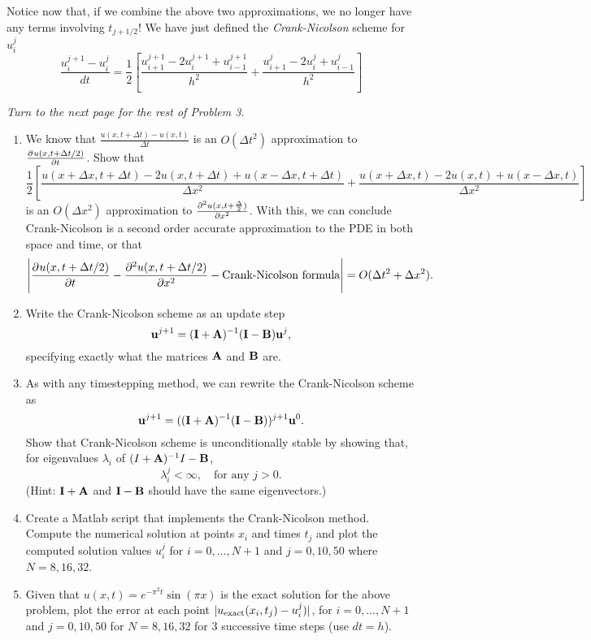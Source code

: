 Notice now that, if we combine the above two approximations, we no longer have any terms involving $t_{j+1/2}$!  We have just defined the \emph{Crank-Nicolson} scheme for $u_i^{j}$
\[
\frac{u_i^{j+ 1}-u_i^{j}}{dt} = \frac{1}{2}\left[\frac{u_{i+1}^{j+1} - 2u_i^{j+1} + u_{i-1}^{j+1}}{h^2} + \frac{u_{i+1}^{j} - 2u_i^{j} + u_{i-1}^{j}}{h^2}\right]
\] 
\vspace{2cm}
\begin{center}
\emph{Turn to the next page for the rest of Problem 3.}
\end{center} 
\newpage
\begin{enumerate}
\item We know that $\frac{u(x,t+\Delta t)-u(x,t)}{\Delta t}$ is an $O(\Delta t^2)$ approximation to $\frac{\partial^{} u(x,t + \Delta t/2)}{\partial t^{}}$.  Show that 
\[
\frac{1}{2}\left[\frac{u(x+ \Delta x,t+\Delta t) - 2u(x,t+\Delta t) + u( x - \Delta x,t+\Delta t)}{\Delta x^2} + \frac{u(x+ \Delta x,t) - 2u(x,t) + u( x - \Delta x,t)}{\Delta x^2} \right]
\]
is an $O(\Delta x^2)$ approximation to $\frac{\partial^{2} u(x,t + \frac{\Delta}{2})}{\partial x^{2}}$.  With this, we can conclude Crank-Nicolson is a second order accurate approximation to the PDE in both space and time, or that 
\[
\left| \frac{\partial^{} u(x,t + \Delta t/2)}{\partial t^{}}-\frac{\partial^{2} u(x,t + \Delta t/2)}{\partial x^{2}} - \text{Crank-Nicolson formula}\right| = O(\Delta t^2 + \Delta x^2).
\]
\item Write the Crank-Nicolson scheme as an update step
\[
{\bf u}^{j+1} = ({{\bf I} + {\bf A}})^{-1} ({{\bf I} - {\bf B}}) {\bf u}^{j},
\]
specifying exactly what the matrices $\bf A$ and $\bf B$ are.  
\item As with any timestepping method, we can rewrite the Crank-Nicolson scheme as
\[
{\bf u}^{j+1} = (({{\bf I} + {\bf A}})^{-1} ({{\bf I} - {\bf B}}))^{j+1} {\bf u}^{0}.
\]
Show that Crank-Nicolson scheme is unconditionally stable by showing that, for eigenvalues $\lambda_i$ of $({I + \bf A})^{-1}{I -\bf B}$, 
\[
\lambda_i^j < \infty, \quad \text{for any } j >0.
\]
(Hint: $\bf I + A$ and $\bf I- B$ should have the same eigenvectors.)
\item Create a Matlab script that implements the Crank-Nicolson method. Compute the numerical solution at points $x_i$ and times $t_j$ and plot the computed solution values $u_i^j$ for $i = 0, . . . , N + 1$ and $j = 0, 10, 50$ where $N = 8, 16, 32$.  
\item Given that $u(x,t)=e^{-\pi^2 t} \sin(\pi x)$  is the exact solution for the above problem, plot the error at each point $|u_{\rm exact}(x_i,t_j) - u_i^j)|$, for $i = 0, . . . , N + 1$ and $j = 0, 10, 50$ for $N = 8, 16, 32$ for $3$ successive time steps (use $dt = h$).  


\end{enumerate}




